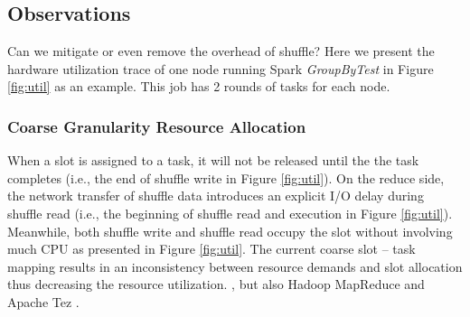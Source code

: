 \subsection{Observations} \label{observation}
Can we mitigate or even remove the overhead of shuffle? 
Here we present the hardware utilization trace of one node running Spark \textit{GroupByTest} in Figure \ref{fig:util} as an example. 
This job has 2 rounds of tasks for each node.
\subsubsection{Coarse Granularity Resource Allocation}
When a slot is assigned to a task, it will not be released until the the task completes (i.e., the end of shuffle write in Figure \ref{fig:util}). 
On the reduce side, the network transfer of shuffle data introduces an explicit I/O delay during shuffle read (i.e., the beginning of shuffle read and execution in Figure \ref{fig:util}). 
Meanwhile, both shuffle write and shuffle read occupy the slot without involving much CPU as presented in Figure \ref{fig:util}. 
The current coarse slot -- task mapping results in an inconsistency between resource demands and slot allocation thus decreasing the resource utilization. 
 \cite{apachespark}, but also Hadoop MapReduce \cite{hadoop} and Apache Tez \cite{tez}. 

